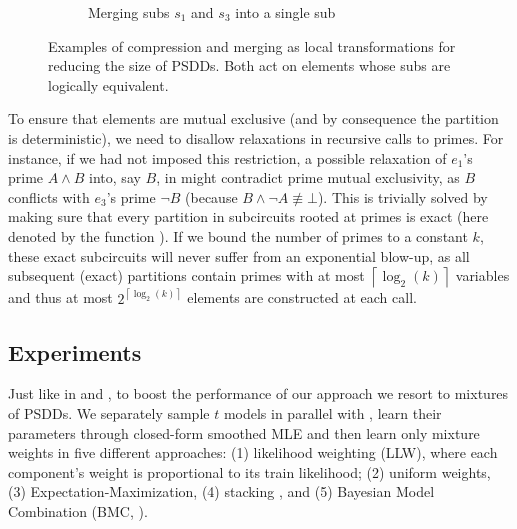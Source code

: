 \begin{figure}[t]
\begin{subfigure}{\textwidth}
    \caption{Merging subs $s_1$ and $s_3$ into a single sub}
    \label{fig:merge}
  \end{subfigure}
  \caption{Examples of compression  and merging  as local
    transformations for reducing the size of PSDDs. Both act on elements whose subs are logically
    equivalent.}
  \label{fig:compmerge}
\end{figure}

To ensure that elements are mutual exclusive (and by consequence the partition is deterministic),
we need to disallow relaxations in recursive calls to primes. For instance, if we had not imposed
this restriction, a possible relaxation of $e_1$'s prime $A\wedge B$ into, say $B$, in
 might contradict prime mutual exclusivity, as $B$ conflicts with $e_3$'s prime
$\neg B$ (because $B\wedge\neg A\not\equiv\bot$). This is trivially solved by making sure that
every partition in subcircuits rooted at primes is exact (here denoted by the function
). If we bound the number of primes to a constant $k$, these exact
subcircuits will never suffer from an exponential blow-up, as all subsequent (exact) partitions
contain primes with at most $\left\lceil\log_2(k)\right\rceil$ variables and thus at most
$2^{\left\lceil\log_2(k)\right\rceil}$ elements are constructed at each call.

\subsection{Experiments}

Just like in  and , to boost the performance of our approach
we resort to mixtures of PSDDs. We separately sample $t$ models in parallel with
, learn their parameters through closed-form smoothed MLE \citep{kisa14} and
then learn only mixture weights in five different approaches: (1) likelihood weighting (LLW), where
each component's weight is proportional to its train likelihood; (2) uniform weights, (3)
Expectation-Maximization, (4) stacking \citep{smyth98}, and (5) Bayesian Model Combination (BMC,
\cite{monteith11}).

